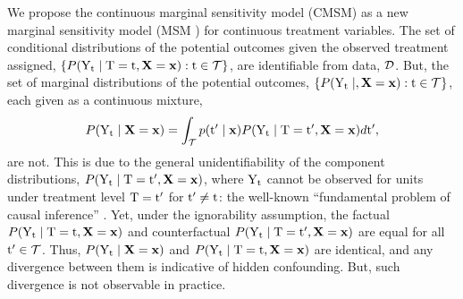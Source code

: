 \label{sec:cmsm}
We propose the continuous marginal sensitivity model (CMSM) as a new marginal sensitivity model (MSM \citep{tan2006msm}) for continuous treatment variables.
The set of conditional distributions of the potential outcomes given the observed treatment assigned, 
$\left\{ P(\mathrm{Y}_{\mathrm{t}} \mid \mathrm{T}=\mathrm{t}, \mathbf{X}=\mathbf{x}) : \mathrm{t} \in \mathcal{T} \right\}$,
are identifiable from data, $\mathcal{D}$. 
But, the set of marginal distributions of the potential outcomes, $\left\{ P(\mathrm{Y}_{\mathrm{t}} \mid, \mathbf{X}=\mathbf{x}) : \mathrm{t} \in \mathcal{T} \right\}$, each given as a continuous mixture,
\begin{equation*}
   P(\mathrm{Y}_{\mathrm{t}} \mid \mathbf{X}=\mathbf{x}) = \int_{\mathcal{T}} p(\mathrm{t}^{\prime} \mid \mathbf{x}) P(\mathrm{Y}_{\mathrm{t}} \mid \mathrm{T}=\mathrm{t}^{\prime}, \mathbf{X}=\mathbf{x}) d\mathrm{t}^{\prime},
\end{equation*}
are not.
This is due to the general unidentifiability of the component distributions, $P(\mathrm{Y}_{\mathrm{t}} \mid \mathrm{T}=\mathrm{t}^{\prime}, \mathbf{X}=\mathbf{x})$, where $\mathrm{Y}_{\mathrm{t}}$ cannot be observed for units under treatment level $\mathrm{T} = \mathrm{t}^{\prime}$ for $\mathrm{t}^{\prime} \neq \mathrm{t}$: the well-known ``fundamental problem of causal inference'' \citep{holland1986statistics}.
Yet, under the ignorability assumption, the factual $P(\mathrm{Y}_{\mathrm{t}} \mid \mathrm{T}=\mathrm{t}, \mathbf{X}=\mathbf{x})$ and counterfactual $P(\mathrm{Y}_{\mathrm{t}} \mid \mathrm{T}=\mathrm{t}^{\prime}, \mathbf{X}=\mathbf{x})$ are equal for all $\mathrm{t}^{\prime} \in \mathcal{T}$.
Thus, $P(\mathrm{Y}_{\mathrm{t}} \mid \mathbf{X}=\mathbf{x})$ and $P(\mathrm{Y}_{\mathrm{t}} \mid \mathrm{T}=\mathrm{t}, \mathbf{X}=\mathbf{x})$ are identical, and any divergence between them is indicative of hidden confounding. 
But, such divergence is not observable in practice.

